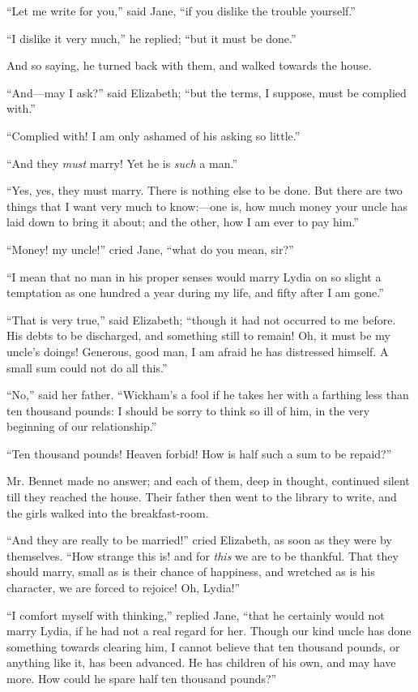 ``Let me write for you,'' said Jane, ``if you dislike the trouble yourself.''

``I dislike it very much,'' he replied; ``but it must be done.''

And so saying, he turned back with them, and walked towards the house.

``And---may I ask?'' said Elizabeth; ``but the terms, I suppose, must be complied with.''

``Complied with! I am only ashamed of his asking so little.''

``And they \textit{must} marry! Yet he is \textit{such} a man.''

``Yes, yes, they must marry. There is nothing else to be done. But there are two things that I want very much to know:---one is, how much money your uncle has laid down to bring it about; and the other, how I am ever to pay him.''

``Money! my uncle!'' cried Jane, ``what do you mean, sir?''

``I mean that no man in his proper senses would marry Lydia on so slight a temptation as one hundred a year during my life, and fifty after I am gone.''

``That is very true,'' said Elizabeth; ``though it had not occurred to me before. His debts to be discharged, and something still to remain! Oh, it must be my uncle's doings! Generous, good man, I am afraid he has distressed himself. A small sum could not do all this.''

``No,'' said her father. ``Wickham's a fool if he takes her with a farthing less than ten thousand pounds: I should be sorry to think so ill of him, in the very beginning of our relationship.''

``Ten thousand pounds! Heaven forbid! How is half such a sum to be repaid?''

Mr. Bennet made no answer; and each of them, deep in thought, continued silent till they reached the house. Their father then went to the library to write, and the girls walked into the breakfast-room.

``And they are really to be married!'' cried Elizabeth, as soon as they were by themselves. ``How strange this is! and for \textit{this} we are to be thankful. That they should marry, small as is their chance of happiness, and wretched as is his character, we are forced to rejoice! Oh, Lydia!''

``I comfort myself with thinking,'' replied Jane, ``that he certainly would not marry Lydia, if he had not a real regard for her. Though our kind uncle has done something towards clearing him, I cannot believe that ten thousand pounds, or anything like it, has been advanced. He has children of his own, and may have more. How could he spare half ten thousand pounds?''

